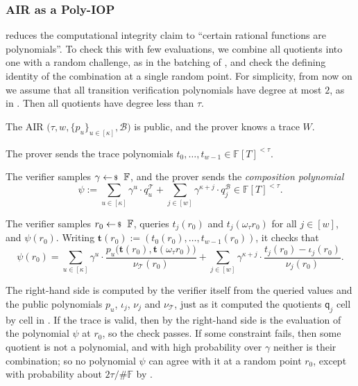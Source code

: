 \documentclass[../../book]{subfiles}
\begin{document}
\subsubsection{AIR as a Poly-IOP}

 reduces the computational integrity claim to ``certain rational functions are polynomials''.
To check this with few evaluations, we combine all quotients into one with a random challenge, as in the batching of ,
and check the defining identity of the combination at a single random point.
For simplicity, from now on we assume that all transition verification polynomials have degree at most $2$, as in .
Then all quotients have degree less than $\tau$.

\begin{definition}\label{def:air-poly-iop}
  The AIR $\big(\tau, w, \{p_u\}_{u \in [\kappa]}, \mathcal{B}\big)$ is public, and the prover knows a trace $W$.
  \begin{algoen}
    \item The prover sends the trace polynomials $t_0, \ldots, t_{w-1} \in \mathbb{F}[T]^{<\tau}$.
    \item The verifier samples $\gamma \leftarrowS \mathbb{F}$, and the prover sends the \emph{composition polynomial}
    \begin{equation*}
      \psi := \sum_{u \in [\kappa]} \gamma^u \cdot q^{\mathcal{T}}_u + \sum_{j \in [w]} \gamma^{\kappa + j} \cdot q^{\mathcal{B}}_j \in \mathbb{F}[T]^{<\tau}.
    \end{equation*}
    \item The verifier samples $r_0 \leftarrowS \mathbb{F}$, queries $t_j(r_0)$ and $t_j(\omega_\tau r_0)$ for all $j \in [w]$, and $\psi(r_0)$.
    Writing $\mathbf{t}(r_0) := (t_0(r_0), \ldots, t_{w-1}(r_0))$, it checks that
    \begin{equation*}
      \psi(r_0) = \sum_{u \in [\kappa]} \gamma^u \cdot \frac{p_u\big(\mathbf{t}(r_0), \mathbf{t}(\omega_\tau r_0)\big)}{\nu_{\mathcal{T}}(r_0)} + \sum_{j \in [w]} \gamma^{\kappa + j} \cdot \frac{t_j(r_0) - \iota_j(r_0)}{\nu_j(r_0)}.
    \end{equation*}
  \end{algoen}
\end{definition}

The right-hand side is computed by the verifier itself from the queried values and the public polynomials $p_u$, $\iota_j$, $\nu_j$ and $\nu_{\mathcal{T}}$, just as it computed the quotients $\mathsf{q}_j$ cell by cell in .
If the trace is valid, then by  the right-hand side is the evaluation of the polynomial $\psi$ at $r_0$, so the check passes.
If some constraint fails, then some quotient is not a polynomial, and with high probability over $\gamma$ neither is their combination; so no polynomial $\psi$ can agree with it at a random point $r_0$, except with probability about $2\tau/\#\mathbb{F}$ by .
\end{document}
